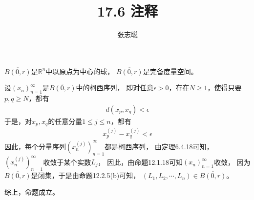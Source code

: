 \documentclass{article}
\begin{document}
\title{17.6 注释}
\author{张志聪}
\maketitle

\begin{zremark}
  $\overline{B(0, r)}$是$\mathbb{R}^n$中以原点为中心的球，
  $\overline{B(0, r)}$是完备度量空间。
\end{zremark}

设$(x_n)_{n = 1}^\infty$是$\overline{B(0, r)}$中的柯西序列，
即对任意$\epsilon > 0$，存在$N \geq 1$，使得只要$p, q \geq N$，都有
\begin{align*}
  d(x_p, x_q) < \epsilon
\end{align*}
于是，对$x_p, x_q$的任意分量$1 \leq j \leq n$，都有
\begin{align*}
  x_{p}^{(j)} - x_{q}^{(j)} < \epsilon
\end{align*}
因此，每个分量序列$(x_n^{(j)})_{n = 1}^\infty$都是柯西序列，
由定理6.4.18可知，
$(x_n^{(j)})_{n = 1}^\infty$收敛于某个实数$L_j$，
因此，由命题12.1.18可知$(x_n)_{n = 1}^\infty$收敛，
因为$\overline{B(0, r)}$是闭集，于是由命题12.2.5(b)可知，
$(L_1, L_2, \cdots, L_n) \in \overline{B(0, r)}$。

综上，命题成立。
\end{document}
